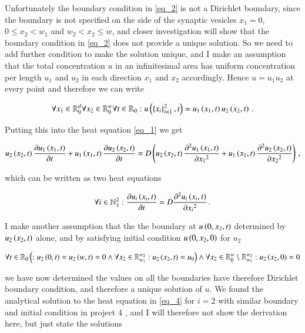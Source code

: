 \documentclass[11pt,english,a4paper]{article}
\begin{document}
\begin{flushleft}
Unfortunately the boundary condition in \eqref{eq_2} is not a Dirichlet boundary, since the boundary is not specified on the side of the synaptic vesicles $x_1=0$, $0\leq x_2 < w_1$ and $w_2 < x_2 \leq w$, and closer investigation will show that the boundary condition in \eqref{eq_2} does not provide a unique solution. So we need to add further condition to make the solution unique, and I make an assumption that the total concentration $u$ in an infinitesimal area has uniform concentration per length $u_1$ and $u_2$ in each direction $x_1$ and $x_2$ accordingly. Hence $u=u_1 u_2$ at every point and therefore we can write

\begin{align}
\forall x_1 \in \mathbb{R}_0^d \forall x_2 \in \mathbb{R}_0^w \forall t \in \mathbb{R}_{0}: u\left({\left\lbrace{x_i}\right\rbrace_{i=1}^2,t}\right) = u_1\left({x_1,t}\right) u_2\left({x_2,t}\right) \,.
\label{eq_3}
\end{align}

Putting this into the heat equation \eqref{eq_1} we get

\begin{align*}
u_2\left({x_2,t}\right)\frac{\partial u_1\left({x_1,t}\right)}{\partial t} + u_1\left({x_1,t}\right)\frac{\partial u_2\left({x_2,t}\right)}{\partial t} = D\left({u_2\left({x_2,t}\right)\frac{\partial^2 u_1\left({x_1,t}\right)}{\partial {x_1}^2} + u_1\left({x_1,t}\right)\frac{\partial^2 u_2\left({x_2,t}\right)}{\partial {x_2}^2}}\right) \,,
\end{align*}

which can be written as two heat equations

\begin{align}
\forall i \in \mathbb{N}_1^2 : \frac{\partial u_i\left({x_i,t}\right)}{\partial t}  = D \frac{\partial^2 u_i\left({x_i,t}\right)}{\partial {x_i}^2} \,.
\label{eq_4}
\end{align}

I make another assumption that the the boundary at $u\left({0,x_2,t}\right)$ determined by $u_2\left({x_2,t}\right)$ alone, and by satisfying initial condition $u\left({0,x_2,0}\right)$ for $u_2$

\begin{align}
\forall t \in \mathbb{R}_0 \left({: u_2\left({0,t}\right) = u_2\left({w,t}\right) = 0 \wedge \forall x_2\in\mathbb{R}_{w_1}^{w_2}: u_2\left({x_2,t}\right) = u_0}\right) \wedge \forall x_2 \in\mathbb{R}_{0}^{w} \setminus \mathbb{R}_{w_1}^{w_2}: u_2\left({x_2,0}\right) = 0
\label{eq_5}
\end{align}

we have now determined the values on all the boundaries have therefore Dirichlet boundary condition, and therefore a unique solution of $u$. We found the analytical solution to the heat equation in \eqref{eq_4} for $i=2$ with similar boundary and initial condition in project 4 \cite{project4}, and I will therefore not show the derivation here, but just state the solutions


\end{flushleft}
\end{document}
